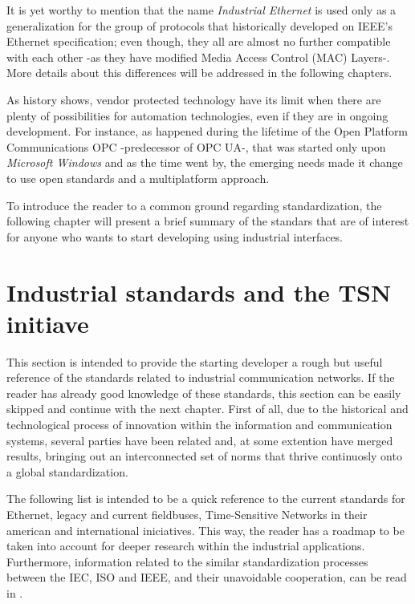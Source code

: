 It is yet worthy to mention that the name \emph{Industrial Ethernet} is used only as a 
generalization for the group of protocols that historically developed on IEEE's Ethernet specification; even though, they all are almost no further
compatible with each other -as they have modified Media Access Control (MAC) Layers-. More details about this differences will be addressed in the following chapters.  

As history shows, vendor protected technology have its limit when there are plenty of possibilities for automation technologies, even if they are in ongoing development. 
For instance, as happened during the lifetime of the Open Platform Communications OPC -predecessor of OPC UA-, that was started only upon \emph{Microsoft Windows} and 
as the time went by, the emerging needs made it change to use open standards and a multiplatform approach.

To introduce the reader to a common ground regarding standardization, the following chapter will present a brief summary of the standars that 
are of interest for anyone who wants to start developing using industrial interfaces.

\section{Industrial standards and the TSN initiave}\label{sec:standards} 
This section is intended to provide the starting developer a rough but useful reference of the standards related to industrial 
communication networks. If the reader has already good knowledge of these standards, this section can be easily skipped and continue 
with the next chapter.
First of all, due to the historical and technological process of innovation within the information and communication 
systems, several parties have been related and, at some extention have merged results, bringing out an interconnected 
set of norms that thrive continuosly onto a global standardization.

The following list is intended to be a quick reference to the current standards for Ethernet, legacy and current fieldbuses, 
Time-Sensitive Networks in their american and international iniciatives. This way, the reader has a roadmap to be taken into
account for deeper research within the industrial applications. 
Furthermore, information related to the similar standardization processes between 
the IEC, ISO and IEEE, and their unavoidable cooperation, can be read in \cite{standards_coop}. %

